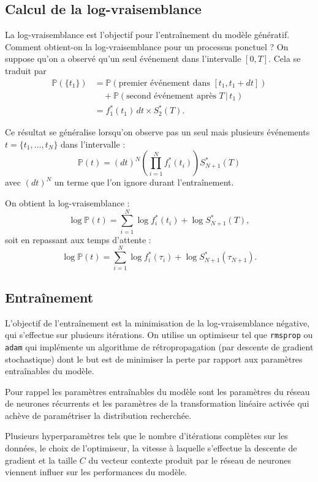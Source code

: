 \documentclass{article}
\theoremstyle{definition}
\theoremstyle{remark}
\begin{document}
\subsection{Calcul de la log-vraisemblance}

La log-vraisemblance est l'objectif pour l'entraînement du modèle génératif.
\cite{dascher2021flexible}
Comment obtient-on la log-vraisemblance pour un processus ponctuel ?
On suppose qu'on a observé qu'un seul événement dans l'intervalle $[0, T]$.
Cela se traduit par
\begin{align*}
\mathbb{P}(\{t_1\})
& = \mathbb{P}(\text{premier événement dans } [t_1, t_1+dt]) \\
& \quad + \mathbb{P}(\text{second événement après } T \, |\,  t_1) \\
& = f^*_1(t_1)\, dt \times S^*_2(T).
\end{align*}

Ce résultat se généralise lorsqu'on observe pas un seul mais plusieurs
événements $t = \{t_1, \dots, t_N\}$ dans l'intervalle :
$$\mathbb{P}(t) = (dt)^N \left(\prod_{i=1}^N f^*_i(t_i)\right)
S^*_{N+1}(T)$$ avec $(dt)^N$ un terme que l'on ignore durant l'entraînement.

On obtient la log-vraisemblance :
$$\log \mathbb{P}(t) = \sum_{i=1}^N \log f^*_i(t_i) + \log S^*_{N+1}(T),$$
soit en repassant aux temps d'attente :
$$\log \mathbb{P}(t) = \sum_{i=1}^N \log f^*_i(\tau_i)
+ \log S^*_{N+1}(\tau_{N+1}).$$

\subsection{Entraînement}

L'objectif de l'entraînement est la minimisation de 
la log-vraisemblance négative, qui s'effectue sur plusieurs itérations.
On utilise un optimiseur tel que \verb|rmsprop| ou \verb|adam| qui implémente
un algorithme de rétropropagation (par descente de gradient stochastique)
dont le but est de minimiser la perte par rapport aux paramètres entraînables
du modèle.

Pour rappel les paramètres entraînables du modèle sont les paramètres
du réseau de neurones récurrents et les paramètres de la transformation
linéaire activée qui achève de paramétriser la distribution recherchée.

Plusieurs hyperparamètres tels que le nombre d'itérations complètes sur les
données, le choix de l'optimiseur, la vitesse à laquelle s'effectue la
descente de gradient et la taille $C$ du vecteur contexte produit par le
réseau de neurones viennent influer sur les performances du modèle.

\printbibliography
\end{document}
